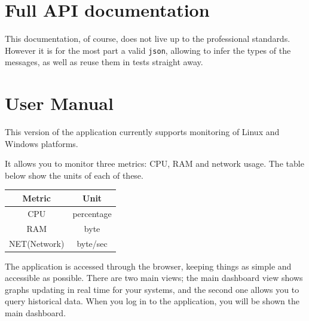 \documentclass{l3proj}
\begin{document}
\begin{appendices}



\chapter{Full API documentation}
\label{API}

This documentation, of course, does not live up to the professional standards. However it is for the most part a valid \texttt{json}, allowing to infer the types of the messages, as well as reuse them in tests straight away. 






\chapter{User Manual}

This version of the application currently supports monitoring of Linux and Windows platforms.

It allows you to monitor three metrics: CPU, RAM and network usage. The table below show the units of each of these. 

\begin{center}
  \begin{tabular}{ | c | c | }
    \hline
     \textbf{Metric} & \textbf{Unit} \\ \hline
        CPU & percentage \\ \hline 
        RAM & byte \\ \hline 
        NET(Network) & byte/sec \\ \hline 
  \end{tabular}
\end{center}

The application is accessed through the browser, keeping things as simple and accessible as possible. There are two main views; the main dashboard view shows graphs updating in real time for your systems, and the second one allows you to query historical data. When you log in to the application, you will be shown the main dashboard.


\end{appendices}
\end{document}
